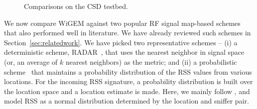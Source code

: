 \begin{figure}[h!]
	\centering
	\caption{Comparisons on the CSD testbed.}
	\label{fig:HR_on_csdtestbed}
\end{figure}

%

We now compare WiGEM against two popular RF signal map-based schemes that also performed well in literature. We have already reviewed such schemes in Section~\ref{sec:relatedwork}. 
We have picked two representative schemes -- (i) a deterministic scheme, RADAR~\cite{Bahl00radar:an}, that uses the nearest neighbor in signal space (or, an average of $k$
nearest neighbors) as the metric; and (ii) a probabilistic scheme~\cite{Haeberlen:2004:PRL:1023720.1023728, Youssef:2008:HLD:1399551.1399558, Roos} that maintains a probability
distribution of the RSS values from various locations. For the incoming RSS signature, a probability distribution is built over the location space and a location estimate is made. Here, we mainly follow \cite{Haeberlen:2004:PRL:1023720.1023728}, and model RSS as a normal distribution determined by the location and sniffer pair. 

